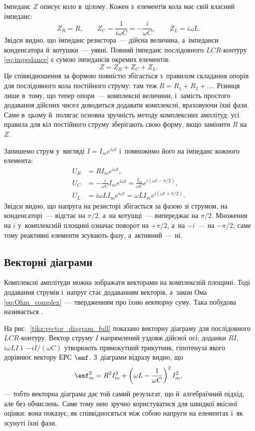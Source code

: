 Імпеданс $Z$ описує коло в~цілому. Кожен з~елементів кола має свій власний імпеданс:
\begin{equation}\label{eq:element_impedances}
	Z_R = R, \qquad Z_C = \frac{1}{i\omega C} = -\frac{i}{\omega C}, \qquad Z_L = i\omega L.
\end{equation}
Звідси видно, що імпеданс резистора~--- дійсна величина, а~імпеданси конденсатора й~котушки~--- уявні.  Повний імпеданс послідовного $LCR$-контуру \eqref{eq:impedance} є сумою імпедансів окремих елементів:
\begin{equation*}
	Z = Z_R + Z_C + Z_L.
\end{equation*}
Це співвідношення за формою повністю збігається з~правилом складання опорів для послідовного кола постійного струму: там теж $R = R_1 + R_2 + \dots$. Різниця лише в~тому, що тепер опори~--- комплексні величини, і~замість простого додавання дійсних чисел доводиться додавати комплексні, враховуючи їхні фази. Саме в~цьому й~полягає основна зручність методу комплексних амплітуд: усі правила для кіл постійного струму зберігають свою форму, якщо замінити $R$ на $Z$.

Запишемо струм у~вигляді $I = I_m e^{i\omega t}$ і~помножимо його на імпеданс кожного елемента:
\begin{align*}
	U_R &= R I_m e^{i\omega t},  \\[4pt]
	U_C &= -\frac{i}{\omega C} I_m e^{i\omega t}
	      = \frac{I_m}{\omega C} e^{i(\omega t - \pi/2)},  \\[4pt]
	U_L &= i\omega L I_m e^{i\omega t}
	      = \omega L I_m e^{i(\omega t + \pi/2)}. 
\end{align*}
Звідси видно, що напруга на резисторі збігається за фазою зі струмом, на конденсаторі~--- відстає на $\pi/2$, а~на котушці~--- випереджає на $\pi/2$. Множення на $i$ у~комплексній площині означає поворот на $+\pi/2$, а~на $-i$~--- на $-\pi/2$; саме тому реактивні елементи зсувають фазу, а~активний~--- ні.

\subsection*{Векторні діаграми}

Комплексні амплітуди можна зображати векторами на комплексній площині. Тоді додавання струмів і~напруг стає додаванням векторів, а~закон Ома \eqref{eq:Ohm_complex}~--- твердженням про їхню \emph{векторну} суму. Така побудова називається .

На рис.~\ref{tikz:vector_diagram_full} показано векторну діаграму для послідовного $LCR$-контуру. Вектор струму $I$ напрямлений уздовж дійсної осі; доданки $RI$, $i\omega L I$ і~$-iI/(\omega C)$ утворюють прямокутний трикутник, гіпотенуза якого дорівнює вектору ЕРС $\emf$. З~діаграми відразу видно, що
\[
	\emf_m^2 = R^2 I_m^2 + \left(\omega L - \frac{1}{\omega C}\right)^2 I_m^2,
\]
--- тобто векторна діаграма дає той самий результат, що й~алгебраїчний підхід, але без обчислень. Саме тому нею зручно користуватися для швидкої якісної оцінки: вона показує, як співвідносяться між собою напруги на елементах і~як зсунуті їхні фази.

